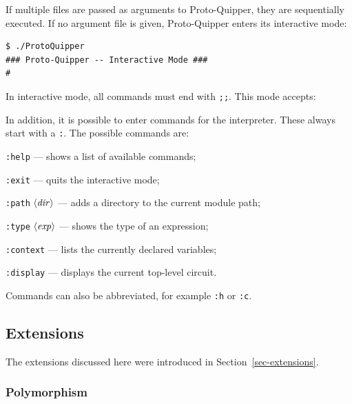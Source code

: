 If multiple files are passed as arguments to Proto-Quipper, they 
are sequentially executed. If no argument file is given, Proto-Quipper 
enters its interactive mode:
\begin{verbatim}
$ ./ProtoQuipper
### Proto-Quipper -- Interactive Mode ###
# 
\end{verbatim}
In interactive mode, all commands must end with \verb#;;#. This mode accepts:
In addition, it is possible to enter commands for the
interpreter. These always start with a \verb#:#. The possible commands are:
\begin{compactitemize}
  \item \verb#:help# --- shows a list of available commands;
  \item \verb#:exit# --- quits the interactive mode;
  \item \verb#:path# $\langle{\it dir}\rangle$ --- adds a directory to the
    current module path;
  \item \verb#:type# $\langle{\it exp}\rangle$ --- shows the type of an expression;
  \item \verb#:context# --- lists the currently declared variables;
  \item \verb#:display# --- displays the current top-level circuit.
\end{compactitemize}
Commands can also be abbreviated, for example \verb#:h# or \verb#:c#.

\subsection{Extensions}

The extensions discussed here were introduced in
Section~\hyperref[sec-extensions]{\ref*{sec-extensions}}.

\subsubsection{Polymorphism}

